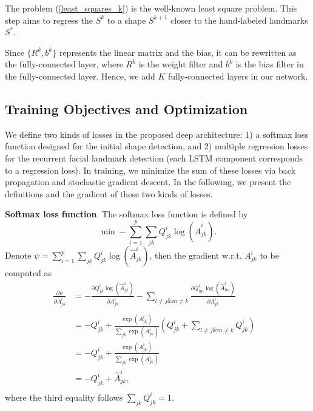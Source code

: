 \documentclass[journal]{IEEEtran}
\begin{document}
The problem (\ref{least_squares_k}) is the well-known least square problem. This step aims to regress the $S^{k}$ to a shape $S^{k+1}$ closer to the hand-labeled landmarks $S^{*}$.

%
Since $\{R^k, b^k\}$ represents the linear matrix and the bias, it can be rewritten as the fully-connected layer, where $R^k$ is the weight filter and $b^k$ is the bias filter in the fully-connected layer. Hence, we add $K$ fully-connected layers in our network.


\subsection{Training Objectives and Optimization}
We define two kinds of losses in the proposed deep architecture: 1) a softmax loss function designed for the initial shape detection, and 2) multiple regression losses for the recurrent facial landmark detection (each LSTM component corresponds to a regression loss). In training, we minimize the sum of these losses via back propagation and stochastic gradient descent. In the following, we present the definitions and the gradient of these two kinds of losses.

\textbf{Softmax loss function}. The softmax loss function is defined by
\begin{equation}
 \min - \sum_{i=1}^p \sum_{jk} Q^i_{jk} \log( \hat{A}^i_{jk}).
\end{equation}
Denote $\psi = \sum_{i=1}^p \sum_{jk} Q^i_{jk} \log( \hat{A}^i_{jk})$, then the gradient w.r.t. $A^i_{jk}$ to be computed as
\begin{equation}
\begin{aligned}
 \frac{\partial \psi}{\partial A^i_{jk} } & = - \frac{\partial Q^i_{jk} \log(\hat{A}^i_{jk})}{\partial A^i_{jk}} - \sum_{l \neq j \&  m \neq k} \frac{\partial Q^i_{lm} \log(\hat{A}^i_{lm})}{\partial A^i_{jk}}& \\
\\
& = -Q^i_{jk}  +  \frac{\exp(A^i_{jk})}{\sum_{jk} \exp(A^i_{jk})} 	 \left( Q^i_{jk} + \sum_{l \neq j \&  m \neq k} Q^i_{jk} \right)  & \\
& =- Q^i_{jk}  + \frac{\exp(A^i_{jk})}{\sum_{jk} \exp(A^i_{jk})}& \\
& = - Q^i_{jk} + \hat{A}^i_{jk}, & \\
 \end{aligned}
\end{equation}
where the third equality follows  $\sum_{jk} Q_{jk}^i = 1$.
\end{document}
